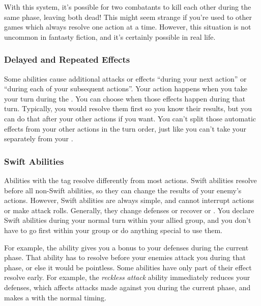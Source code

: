    With this system, it's possible for two combatants to kill each other during the same phase, leaving both dead!
    This might seem strange if you're used to other games which always resolve one action at a time.
    However, this situation is not uncommon in fantasty fiction, and it's certainly possible in real life.

    \subsubsection{Delayed and Repeated Effects}
      Some abilities cause additional attacks or effects ``during your next action'' or ``during each of your subsequent actions''.
      Your action happens when you take your turn during the .
      You can choose when those effects happen during that turn.
      Typically, you would resolve them first so you know their results, but you can do that after your other actions if you want.
      You can't split those automatic effects from your other actions in the turn order, just like you can't take your  separately from your .

    \subsubsection{Swift Abilities}\label{Swift Abilities}
      Abilities with the  tag resolve differently from most actions.
      Swift abilities resolve before all non-Swift abilities, so they can change the results of your enemy's actions.
      However, Swift abilities are always simple, and cannot interrupt actions or make attack rolls.
      Generally, they change defenses or recover  or .
      You declare Swift abilities during your normal turn within your allied group, and you don't have to go first within your group or do anything special to use them.

      For example, the  ability gives you a bonus to your defenses during the current phase.
      That ability has to resolve before your enemies attack you during that phase, or else it would be pointless.
      Some abilities have only part of their effect resolve early.
      For example, the \textit{reckless attack} ability immediately reduces your defenses, which affects attacks made against you during the current phase, and makes a  with the normal timing.

